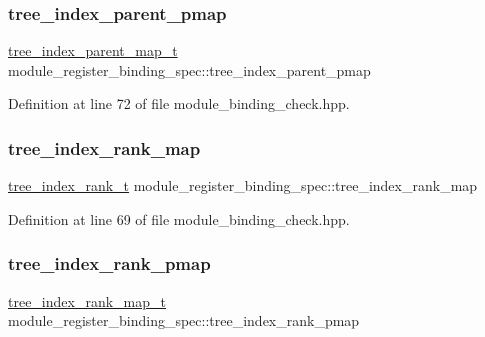 \subsubsection{\texorpdfstring{tree\+\_\+index\+\_\+parent\+\_\+pmap}{tree\_index\_parent\_pmap}}
{\footnotesize\ttfamily \hyperlink{classmodule__register__binding__spec_a5d303749648df3668e9ccf7c368660cb}{tree\+\_\+index\+\_\+parent\+\_\+map\+\_\+t} module\+\_\+register\+\_\+binding\+\_\+spec\+::tree\+\_\+index\+\_\+parent\+\_\+pmap\hspace{0.3cm}{\ttfamily [private]}}



Definition at line 72 of file module\+\_\+binding\+\_\+check.\+hpp.

\mbox{\label{classmodule__register__binding__spec_a2ba94e276e0490f7e63e0b723a603438}} 
\subsubsection{\texorpdfstring{tree\+\_\+index\+\_\+rank\+\_\+map}{tree\_index\_rank\_map}}
{\footnotesize\ttfamily \hyperlink{classmodule__register__binding__spec_a151eec9e0ca85fdf97be1090bf8d46ad}{tree\+\_\+index\+\_\+rank\+\_\+t} module\+\_\+register\+\_\+binding\+\_\+spec\+::tree\+\_\+index\+\_\+rank\+\_\+map\hspace{0.3cm}{\ttfamily [private]}}



Definition at line 69 of file module\+\_\+binding\+\_\+check.\+hpp.

\mbox{\label{classmodule__register__binding__spec_aef706cf750b380dd274d647ecd4ee5a1}} 
\subsubsection{\texorpdfstring{tree\+\_\+index\+\_\+rank\+\_\+pmap}{tree\_index\_rank\_pmap}}
{\footnotesize\ttfamily \hyperlink{classmodule__register__binding__spec_a8336f338b308445a062ca2f293617f67}{tree\+\_\+index\+\_\+rank\+\_\+map\+\_\+t} module\+\_\+register\+\_\+binding\+\_\+spec\+::tree\+\_\+index\+\_\+rank\+\_\+pmap\hspace{0.3cm}{\ttfamily [private]}}



